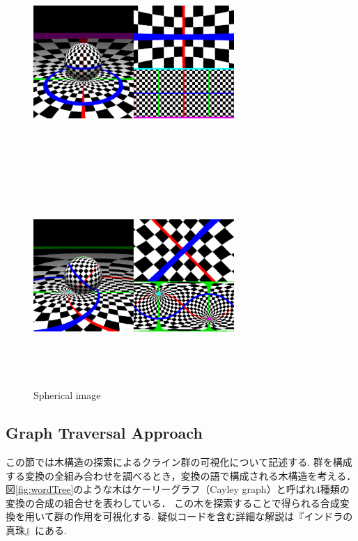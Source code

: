 \begin{figure}[htbp]
 \begin{minipage}{0.5\hsize}
  \center
  \includegraphics[width=3in, height=3in, keepaspectratio]{../img/klein/spherical.pdf}
  \label{fig:sphericalStandard}
 \end{minipage}
 \begin{minipage}{0.5\hsize}
  \center
  \includegraphics[width=3in, height=3in, keepaspectratio]{../img/klein/sphericalRotation.pdf}
  \label{fig:sphericalRotation}
 \end{minipage}
 \caption{Spherical image}
 \label{fig:spherical}
\end{figure}

\subsection{Graph Traversal Approach}

この節では木構造の探索によるクライン群の可視化について記述する.
群を構成する変換の全組み合わせを調べるとき，変換の語で構成される木構造を考える．
図\ref{fig:wordTree}のような木はケーリーグラフ（Cayley graph）と呼ばれ4種類の変換の合成の組合せを表わしている．
この木を探索することで得られる合成変換を用いて群の作用を可視化する.
疑似コードを含む詳細な解説は『インドラの真珠』にある.

